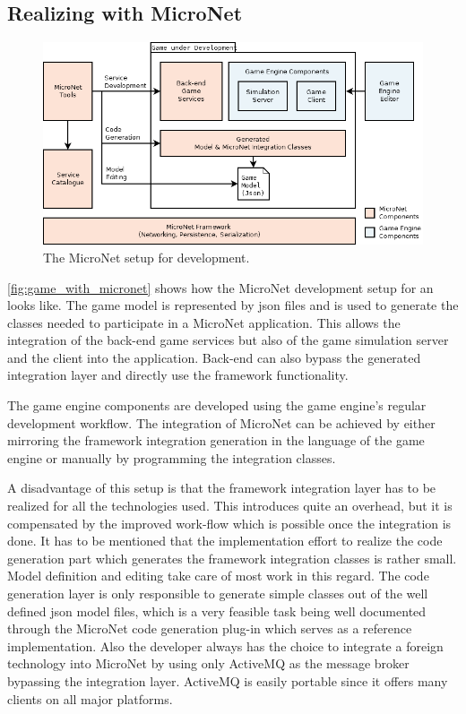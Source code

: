\subsection{Realizing \ogs{} with MicroNet}

\begin{figure}
	\centering
	\includegraphics[width=\textwidth]{images/architecture/GameWithMicroNet}
	\caption{The MicroNet setup for \og{} development.}
	\label{fig:game_with_micronet}
\end{figure}

\autoref{fig:game_with_micronet} shows how the MicroNet development setup for an
\og{} looks like. The game model is represented by \gls{json} files and is used
to generate the classes needed to participate in a MicroNet application. This
allows the integration of the back-end game services but also of the game
simulation server and the client into the application. Back-end can also bypass
the generated integration layer and directly use the framework functionality.

The game engine components are developed using the game engine's regular
development workflow. The integration of MicroNet can be achieved by either
mirroring the framework integration generation in the language of the game
engine or manually by programming the integration classes.

A disadvantage of this setup is that the framework integration layer has to be
realized for all the technologies used. This introduces quite an overhead, but
it is compensated by the improved work-flow which is possible once the
integration is done. It has to be mentioned that the implementation effort to
realize the code generation part which generates the framework integration
classes is rather small. Model definition and editing take care of most work in
this regard. The code generation layer is only responsible to generate simple
classes out of the well defined \gls{json} model files, which is a very
feasible task being well documented through the MicroNet code generation plug-in
which serves as a reference implementation. Also the developer always has the
choice to integrate a foreign technology into MicroNet by using only ActiveMQ as
the message broker bypassing the integration layer. ActiveMQ is easily portable
since it offers many clients on all major platforms. 

